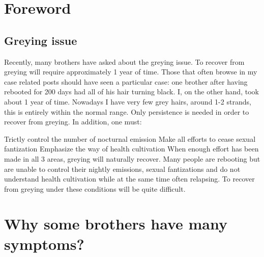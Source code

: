 \documentclass[
]{book}
\begin{document}
\hypertarget{foreword-3}{%
\section{Foreword}\label{foreword-3}}

\hypertarget{greying-issue}{%
\subsection{Greying issue}\label{greying-issue}}

Recently, many brothers have asked about the greying issue. To recover from greying will require approximately 1 year of time. Those that often browse in my case related posts should have seen a particular case: one brother after having rebooted for 200 days had all of his hair turning black. I, on the other hand, took about 1 year of time. Nowadays I have very few grey hairs, around 1-2 strands, this is entirely within the normal range. Only persistence is needed in order to recover from greying. In addition, one must:

Trictly control the number of nocturnal emission
Make all efforts to cease sexual fantization
Emphasize the way of health cultivation
When enough effort has been made in all 3 areas, greying will naturally recover. Many people are rebooting but are unable to control their nightly emissions, sexual fantizations and do not understand health cultivation while at the same time often relapsing. To recover from greying under these conditions will be quite difficult.

\hypertarget{why-some-brothers-have-many-symptoms}{%
\section{Why some brothers have many symptoms?}\label{why-some-brothers-have-many-symptoms}}
\end{document}
